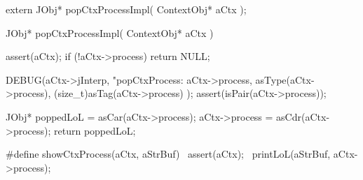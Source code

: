 \startCHeader
extern JObj* popCtxProcessImpl(
  ContextObj* aCtx
);
\stopCHeader
{}

\startCCode
JObj* popCtxProcessImpl(
  ContextObj* aCtx
) {
  assert(aCtx);
  if (!aCtx->process) return NULL;

  DEBUG(aCtx->jInterp, "popCtxProcess: %
    aCtx->process, asType(aCtx->process), (size_t)asTag(aCtx->process)
  );
  assert(isPair(aCtx->process));
  
  JObj* poppedLoL = asCar(aCtx->process);
  aCtx->process   = asCdr(aCtx->process);
  return poppedLoL;
}
\stopCCode

\startCHeader
#define showCtxProcess(aCtx, aStrBuf) \
  assert(aCtx);                       \
  printLoL(aStrBuf, aCtx->process);   \
\stopCHeader

